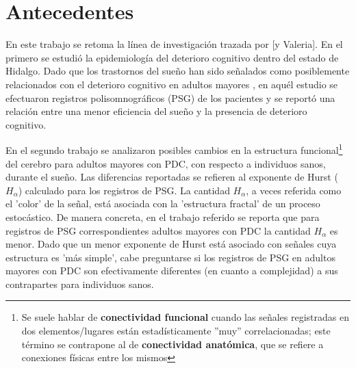 \documentclass[12pt,a4paper]{mitthesis}
\begin{document}

\setcounter{page}{1}

\chapter{Antecedentes}

En este trabajo se retoma la l\'inea de investigaci\'on trazada por \cite{VazquezTagle16} [y
Valeria]. 
En el primero se estudi\'o la epidemiolog\'ia del deterioro cognitivo dentro del estado de
Hidalgo. Dado que los trastornos del sue\~no han sido se\~nalados como posiblemente relacionados
con el deterioro cognitivo en adultos mayores \cite{Amer13,Miyata13,Potvin12}, en aqu\'el estudio
se efectuaron registros polisomnogr\'aficos (PSG) de los pacientes y se report\'o una relaci\'on
entre una menor eficiencia del sue\~no y la presencia de deterioro cognitivo.

En el segundo trabajo se analizaron posibles cambios en la estructura funcional\footnote{Se suele 
hablar de \textbf{conectividad funcional} cuando las se\~nales registradas en dos elementos/lugares 
est\'an estad\'isticamente ''muy'' correlacionadas; este t\'ermino se contrapone al de
\textbf{conectividad anat\'omica}, que se refiere a conexiones f\'isicas entre los mismos} del 
cerebro para adultos mayores con PDC, con respecto a individuos sanos, durante el sue\~no.
Las diferencias reportadas se refieren al exponente de Hurst ($H_\alpha$) calculado para los 
registros de PSG.
La cantidad $H_\alpha$, a veces referida como el 'color' de la se\~nal, est\'a asociada con la
'estructura fractal' de un proceso estoc\'astico. De manera concreta, en el trabajo referido se 
reporta que para registros de PSG correspondientes adultos mayores con PDC la cantidad $H_\alpha$ 
es menor. Dado que un menor exponente de Hurst est\'a asociado con se\~nales cuya estructura es 
'm\'as simple', cabe preguntarse si los registros de PSG en adultos mayores con PDC son 
efectivamente diferentes (en cuanto a complejidad) a sus contrapartes para individuos sanos. 
\end{document}
